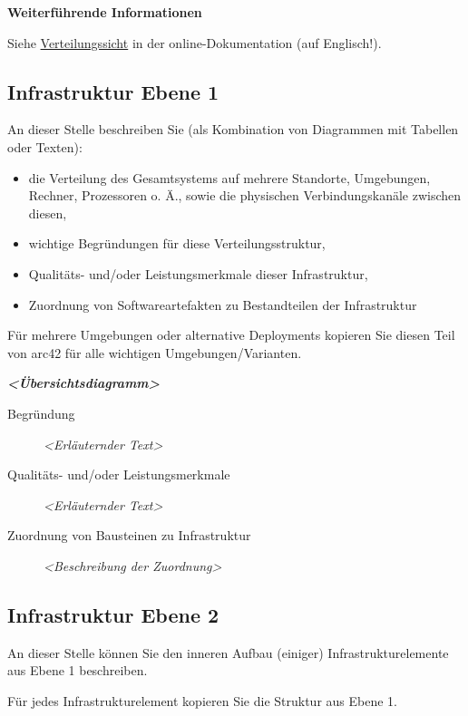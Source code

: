 \documentclass[a4paper,12pt]{article}
\begin{document}
\textbf{Weiterführende Informationen}

Siehe \href{https://docs.arc42.org/section-7/}{Verteilungssicht} in der
online-Dokumentation (auf Englisch!).

\subsection{Infrastruktur Ebene 1}\label{_infrastruktur_ebene_1}

An dieser Stelle beschreiben Sie (als Kombination von Diagrammen mit
Tabellen oder Texten):

\begin{itemize}
\item
  die Verteilung des Gesamtsystems auf mehrere Standorte, Umgebungen,
  Rechner, Prozessoren o. Ä., sowie die physischen Verbindungskanäle
  zwischen diesen,
\item
  wichtige Begründungen für diese Verteilungsstruktur,
\item
  Qualitäts- und/oder Leistungsmerkmale dieser Infrastruktur,
\item
  Zuordnung von Softwareartefakten zu Bestandteilen der Infrastruktur
\end{itemize}

Für mehrere Umgebungen oder alternative Deployments kopieren Sie diesen
Teil von arc42 für alle wichtigen Umgebungen/Varianten.

\emph{\textbf{\textless Übersichtsdiagramm\textgreater{}}}

\begin{description}
\item[Begründung]
\emph{\textless Erläuternder Text\textgreater{}}
\item[Qualitäts- und/oder Leistungsmerkmale]
\emph{\textless Erläuternder Text\textgreater{}}
\item[Zuordnung von Bausteinen zu Infrastruktur]
\emph{\textless Beschreibung der Zuordnung\textgreater{}}
\end{description}

\subsection{Infrastruktur Ebene 2}\label{_infrastruktur_ebene_2}

An dieser Stelle können Sie den inneren Aufbau (einiger)
Infrastrukturelemente aus Ebene 1 beschreiben.

Für jedes Infrastrukturelement kopieren Sie die Struktur aus Ebene 1.
\end{document}
